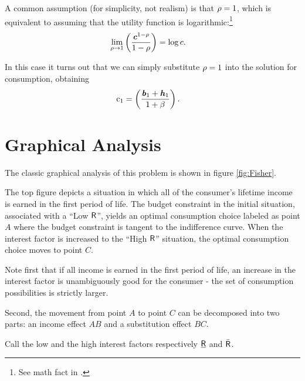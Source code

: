 \documentclass{scrartcl}
\begin{document}
  A common assumption (for simplicity, not realism) is that $\rho=1$, which is equivalent to assuming that the utility function is logarithmic:\footnote{See math fact \CRRALim in \MathFactsList.}
  \begin{equation}\begin{gathered}\begin{aligned} \lim_{\rho \rightarrow 1} \left(\frac{\boldsymbol{\mathit{c}}^{1-\rho}}{1-\rho}\right) & = \log c.
      \end{aligned}\end{gathered}\end{equation}

  In this case it turns out that we can simply substitute $\rho=1$ into the solution for consumption, obtaining
  \begin{equation}\begin{gathered}\begin{aligned} \mathrm{c}_{1} & = \left(\frac{\boldsymbol{\mathit{b}}_{1}+\boldsymbol{\mathit{h}}_{1}}{1+\beta}\right).
      \end{aligned}\end{gathered}\end{equation}


  \section{Graphical Analysis}

  The classic graphical analysis of this problem is shown in figure \ref{fig:Fisher}.

  The top figure depicts a situation in which all of the consumer's lifetime income is earned in the first period of life.  The budget constraint in the initial situation, associated with a ``Low $\mathsf{R}$'', yields an optimal consumption choice labeled as point $A$ where the budget constraint is tangent to the indifference curve.  When the interest factor is increased to the ``High $\mathsf{R}$'' situation, the optimal consumption choice moves to point $C$.

  Note first that if all income is earned in the first period of life, an increase in the interest factor is unambiguously good for the consumer - the set of consumption possibilities is strictly larger.

  Second, the movement from point $A$ to point $C$ can be decomposed into two parts: an income effect $AB$ and a substitution effect $BC$.

  Call the low and the high interest factors respectively $\underline{\mathsf{R}}$ and $\bar{\mathsf{R}}$.
\end{document}
